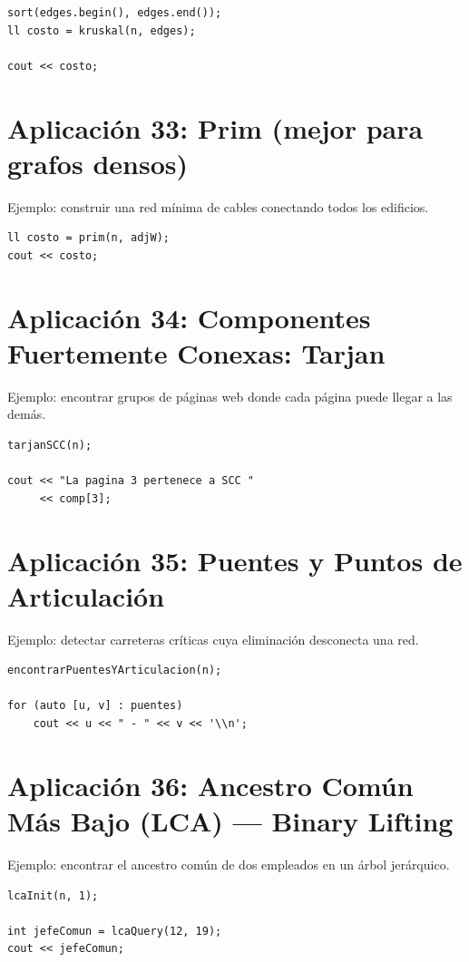 \documentclass[10pt,twocolumn,letterpaper]{report}
\begin{document}
\begin{lstlisting}
sort(edges.begin(), edges.end());
ll costo = kruskal(n, edges);

cout << costo;
\end{lstlisting}

\section{Aplicación 33: Prim (mejor para grafos densos)}
Ejemplo: construir una red mínima de cables conectando todos los edificios.

\begin{lstlisting}
ll costo = prim(n, adjW);
cout << costo;
\end{lstlisting}

\section{Aplicación 34: Componentes Fuertemente Conexas: Tarjan}
Ejemplo: encontrar grupos de páginas web donde cada página puede llegar a las demás.

\begin{lstlisting}
tarjanSCC(n);

cout << "La pagina 3 pertenece a SCC "
     << comp[3];
\end{lstlisting}

\section{Aplicación 35: Puentes y Puntos de Articulación}
Ejemplo: detectar carreteras críticas cuya eliminación desconecta una red.

\begin{lstlisting}
encontrarPuentesYArticulacion(n);

for (auto [u, v] : puentes)
    cout << u << " - " << v << '\\n';
\end{lstlisting}

\section{Aplicación 36: Ancestro Común Más Bajo (LCA) --- Binary Lifting}
Ejemplo: encontrar el ancestro común de dos empleados en un árbol jerárquico.

\begin{lstlisting}
lcaInit(n, 1);

int jefeComun = lcaQuery(12, 19);
cout << jefeComun;
\end{lstlisting}
\end{document}
